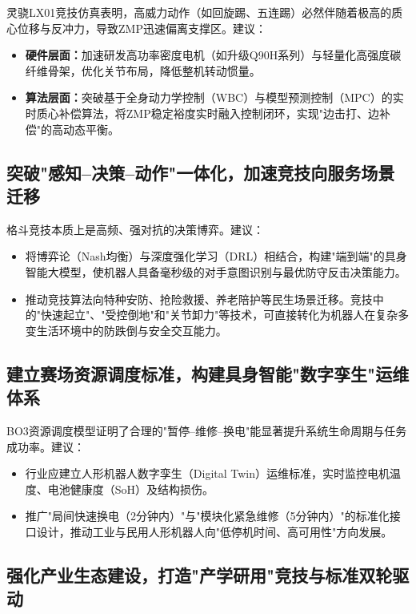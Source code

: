 \documentclass[a4paper,12pt]{article}
\numberwithin{equation}{section}
\numberwithin{table}{section}
\numberwithin{figure}{section}
\begin{document}
灵骁LX01竞技仿真表明，高威力动作（如回旋踢、五连踢）必然伴随着极高的质心位移与反冲力，导致ZMP迅速偏离支撑区。建议：
\begin{itemize}
    \item \textbf{硬件层面：}加速研发高功率密度电机（如升级Q90H系列）与轻量化高强度碳纤维骨架，优化关节布局，降低整机转动惯量。
    \item \textbf{算法层面：}突破基于全身动力学控制（WBC）与模型预测控制（MPC）的实时质心补偿算法，将ZMP稳定裕度实时融入控制闭环，实现"边击打、边补偿"的高动态平衡。
\end{itemize}

\subsection{突破"感知--决策--动作"一体化，加速竞技向服务场景迁移}

格斗竞技本质上是高频、强对抗的决策博弈。建议：
\begin{itemize}
    \item 将博弈论（Nash均衡）与深度强化学习（DRL）相结合，构建"端到端"的具身智能大模型，使机器人具备毫秒级的对手意图识别与最优防守反击决策能力。
    \item 推动竞技算法向特种安防、抢险救援、养老陪护等民生场景迁移。竞技中的"快速起立"、"受控倒地"和"关节卸力"等技术，可直接转化为机器人在复杂多变生活环境中的防跌倒与安全交互能力。
\end{itemize}

\subsection{建立赛场资源调度标准，构建具身智能"数字孪生"运维体系}

BO3资源调度模型证明了合理的"暂停--维修--换电"能显著提升系统生命周期与任务成功率。建议：
\begin{itemize}
    \item 行业应建立人形机器人数字孪生（Digital Twin）运维标准，实时监控电机温度、电池健康度（SoH）及结构损伤。
    \item 推广"局间快速换电（2分钟内）"与"模块化紧急维修（5分钟内）"的标准化接口设计，推动工业与民用人形机器人向"低停机时间、高可用性"方向发展。
\end{itemize}

\subsection{强化产业生态建设，打造"产学研用"竞技与标准双轮驱动}
\end{document}
